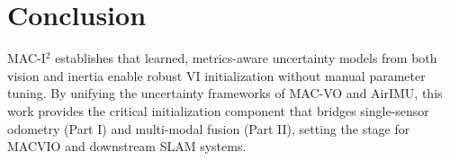 \section{Conclusion}

MAC-I$^2$ establishes that learned, metrics-aware uncertainty models from both vision and inertia enable robust VI initialization without manual parameter tuning. By unifying the uncertainty frameworks of MAC-VO and AirIMU, this work provides the critical initialization component that bridges single-sensor odometry (Part I) and multi-modal fusion (Part II), setting the stage for MACVIO and downstream SLAM systems.
